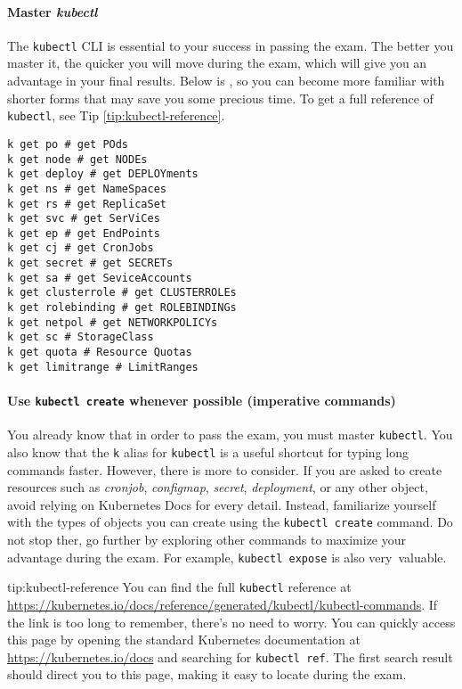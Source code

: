 \paragraph{Master \textit{kubectl}} The \texttt{kubectl} CLI is essential to your success in passing the exam. The better you master it, the quicker you will move during the exam, which will give you an advantage in your final results. Below is , so you can become more familiar with shorter forms that may save you some precious time. To get a full reference of \texttt{kubectl}, see Tip \ref{tip:kubectl-reference}.

\begin{lstlisting}[label=lst:kubectl-get-short-forms, caption=Short forms of kubectl get command]
k get po # get POds
k get node # get NODEs
k get deploy # get DEPLOYments
k get ns # get NameSpaces
k get rs # get ReplicaSet
k get svc # get SerViCes
k get ep # get EndPoints
k get cj # get CronJobs
k get secret # get SECRETs
k get sa # get SeviceAccounts
k get clusterrole # get CLUSTERROLEs
k get rolebinding # get ROLEBINDINGs
k get netpol # get NETWORKPOLICYs
k get sc # StorageClass
k get quota # Resource Quotas
k get limitrange # LimitRanges
\end{lstlisting}

\paragraph{Use \texttt{kubectl create} whenever possible (imperative commands)}  
You already know that in order to pass the exam, you must master \texttt{kubectl}\cite{kubectl-commands}.  
You also know that the \texttt{k} alias for \texttt{kubectl} is a useful shortcut for typing long commands faster.  
However, there is more to consider. If you are asked to create resources such as \textit{cronjob}, \textit{configmap}, \textit{secret}, \textit{deployment}, or any other object, avoid relying on Kubernetes Docs\cite{kubernetes-docs} for every detail.  
Instead, familiarize yourself with the types of objects you can create using the \texttt{kubectl create} command.  
Do not stop ther, go further by exploring other commands to maximize your advantage during the exam. For example, \texttt{kubectl expose} is also very~valuable.

\begin{tip}{tip:kubectl-reference}
	You can find the full \texttt{kubectl} reference at \url{https://kubernetes.io/docs/reference/generated/kubectl/kubectl-commands}. If the link is too long to remember, there's no need to worry. You can quickly access this page by opening the standard Kubernetes documentation at \url{https://kubernetes.io/docs} and searching for \texttt{kubectl ref}. The first search result should direct you to this page, making it easy to locate during the exam.
\end{tip}

